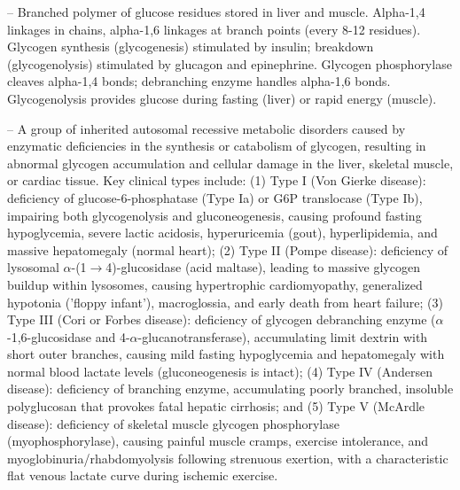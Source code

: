 -- Branched polymer of glucose residues stored in liver and muscle. Alpha-1,4 linkages in chains, alpha-1,6 linkages at branch points (every 8-12 residues). Glycogen synthesis (glycogenesis) stimulated by insulin; breakdown (glycogenolysis) stimulated by glucagon and epinephrine. Glycogen phosphorylase cleaves alpha-1,4 bonds; debranching enzyme handles alpha-1,6 bonds. Glycogenolysis provides glucose during fasting (liver) or rapid energy (muscle).

-- A group of inherited autosomal recessive metabolic disorders caused by enzymatic deficiencies in the synthesis or catabolism of glycogen, resulting in abnormal glycogen accumulation and cellular damage in the liver, skeletal muscle, or cardiac tissue. Key clinical types include: (1) Type I (Von Gierke disease): deficiency of glucose-6-phosphatase (Type Ia) or G6P translocase (Type Ib), impairing both glycogenolysis and gluconeogenesis, causing profound fasting hypoglycemia, severe lactic acidosis, hyperuricemia (gout), hyperlipidemia, and massive hepatomegaly (normal heart); (2) Type II (Pompe disease): deficiency of lysosomal $\alpha$-(1$\to$4)-glucosidase (acid maltase), leading to massive glycogen buildup within lysosomes, causing hypertrophic cardiomyopathy, generalized hypotonia ('floppy infant'), macroglossia, and early death from heart failure; (3) Type III (Cori or Forbes disease): deficiency of glycogen debranching enzyme ($\alpha$-1,6-glucosidase and 4-$\alpha$-glucanotransferase), accumulating limit dextrin with short outer branches, causing mild fasting hypoglycemia and hepatomegaly with normal blood lactate levels (gluconeogenesis is intact); (4) Type IV (Andersen disease): deficiency of branching enzyme, accumulating poorly branched, insoluble polyglucosan that provokes fatal hepatic cirrhosis; and (5) Type V (McArdle disease): deficiency of skeletal muscle glycogen phosphorylase (myophosphorylase), causing painful muscle cramps, exercise intolerance, and myoglobinuria/rhabdomyolysis following strenuous exertion, with a characteristic flat venous lactate curve during ischemic exercise.

